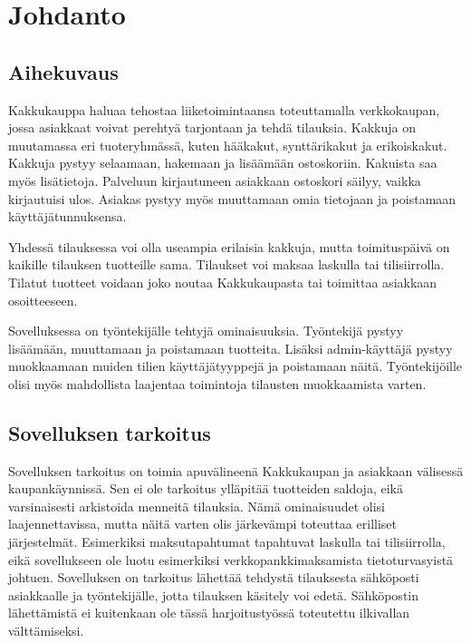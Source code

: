 \documentclass[a4paper,12pt, titlepage]{article}
\begin{document}

\tableofcontents
\newpage

\section{Johdanto}
\subsection*{Aihekuvaus}
Kakkukauppa haluaa tehostaa liiketoimintaansa toteuttamalla verkkokaupan, jossa asiakkaat voivat perehtyä tarjontaan ja tehdä tilauksia. Kakkuja on muutamassa eri tuoteryhmässä, kuten hääkakut, synttärikakut ja erikoiskakut. Kakkuja pystyy selaamaan, hakemaan ja lisäämään ostoskoriin. Kakuista saa myös lisätietoja. Palveluun kirjautuneen asiakkaan ostoskori säilyy, vaikka kirjautuisi ulos. Asiakas pystyy myös muuttamaan omia tietojaan ja poistamaan käyttäjätunnuksensa. 

Yhdessä tilauksessa voi olla useampia erilaisia kakkuja, mutta toimituspäivä on kaikille tilauksen tuotteille sama. Tilaukset voi maksaa laskulla tai tilisiirrolla. Tilatut tuotteet voidaan joko noutaa Kakkukaupasta tai toimittaa asiakkaan osoitteeseen. 

Sovelluksessa on työntekijälle tehtyjä ominaisuuksia. Työntekijä pystyy lisäämään, muuttamaan ja poistamaan tuotteita. Lisäksi admin-käyttäjä pystyy muokkaamaan muiden tilien käyttäjätyyppejä ja poistamaan näitä. Työntekijöille olisi myös mahdollista laajentaa toimintoja tilausten muokkaamista varten. 

\subsection*{Sovelluksen tarkoitus}
Sovelluksen tarkoitus on toimia apuvälineenä Kakkukaupan ja asiakkaan välisessä kaupankäynnissä. Sen ei ole tarkoitus ylläpitää tuotteiden saldoja, eikä varsinaisesti arkistoida menneitä tilauksia. Nämä ominaisuudet olisi laajennettavissa, mutta näitä varten olis järkevämpi toteuttaa erilliset järjestelmät. Esimerkiksi maksutapahtumat tapahtuvat laskulla tai tilisiirrolla, eikä sovellukseen ole luotu esimerkiksi verkkopankkimaksamista tietoturvasyistä johtuen. Sovelluksen on tarkoitus lähettää tehdystä tilauksesta sähköposti asiakkaalle ja työntekijälle, jotta tilauksen käsitely voi edetä. Sähköpostin lähettämistä ei kuitenkaan ole tässä harjoitustyössä toteutettu ilkivallan välttämiseksi.
\end{document}
